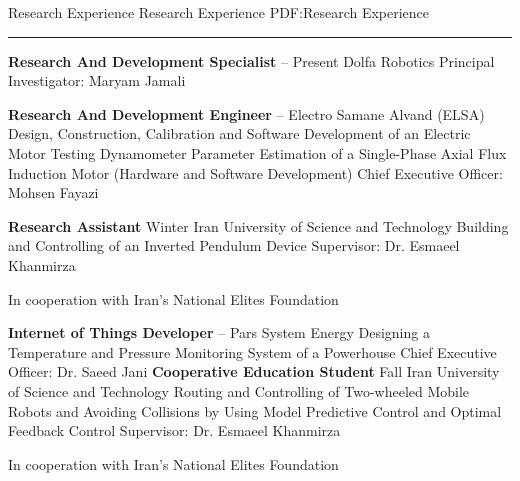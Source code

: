 \documentclass[letterpaper,MMMyyyy]{ResumeTemplate}
\begin{document}
\begin{Body}


\Section
{Research Experience}
{Research Experience}
{PDF:Research Experience}
\textcolor{Forestg}{\vspace{0.05cm}\hrule height 0.1cm}\BigGap
\Entry
\vspace{5pt}
\textbf{Research And Development Specialist}
\hfill
\textcolor{OrangeY}{ – Present}
\Gap
\BulletItem
Dolfa Robotics
\SubBulletItem
Principal Investigator: Maryam Jamali

\Entry
\vspace{5pt}
\textbf{Research And Development Engineer}
\hfill
\textcolor{OrangeY}{ – }
\Gap
\BulletItem
Electro Samane Alvand (ELSA)
\SubBulletItem
Design, Construction, Calibration and Software Development of an Electric Motor Testing Dynamometer 
\SubBulletItem
Parameter Estimation of a Single-Phase Axial Flux Induction Motor (Hardware and Software Development) 
\SubBulletItem
Chief Executive Officer: Mohsen Fayazi


\Entry
\vspace{5pt}
\textbf{Research Assistant}
\hfill
\textcolor{OrangeY}{Winter }
\Gap
\BulletItem
Iran University of Science and Technology
\SubBulletItem
Building and Controlling of an Inverted Pendulum Device
\SubBulletItem
Supervisor: Dr. Esmaeel Khanmirza
\begin{Detail}
	\qquad In cooperation with Iran's National Elites Foundation
\end{Detail}


\Entry
\vspace{5pt}
\textbf{Internet of Things Developer}
\hfill
\textcolor{OrangeY}{\textcolor{OrangeY}{ –
}}
\Gap
\BulletItem
Pars System Energy
\SubBulletItem
Designing a Temperature and Pressure Monitoring System of a Powerhouse
\SubBulletItem
Chief Executive Officer: Dr. Saeed Jani
\Entry
\vspace{5pt}
\textbf{Cooperative Education Student}
\hfill
\textcolor{OrangeY}{Fall }
\Gap
\BulletItem
Iran University of Science and Technology
\SubBulletItem
Routing and Controlling of Two-wheeled Mobile Robots and Avoiding Collisions by Using Model Predictive Control and Optimal Feedback Control
\SubBulletItem
Supervisor: Dr. Esmaeel Khanmirza
\begin{Detail}
	\qquad In cooperation with Iran's National Elites Foundation
\end{Detail}




\end{Body}
\end{document}

